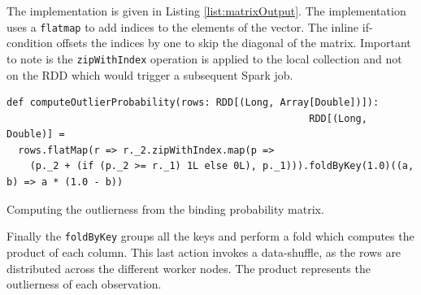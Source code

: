 The implementation is given in Listing \ref{list:matrixOutput}. The implementation uses a \texttt{flatmap} to add indices to the elements of the vector. The inline if-condition offsets the indices by one to skip the diagonal of the matrix. Important to note is the \texttt{zipWithIndex} operation is applied to the local collection and not on the RDD which would trigger a subsequent Spark job.

\begin{listing}[ht!]
\begin{verbatim}
def computeOutlierProbability(rows: RDD[(Long, Array[Double])]):
                                                    RDD[(Long, Double)] =
  rows.flatMap(r => r._2.zipWithIndex.map(p =>
    (p._2 + (if (p._2 >= r._1) 1L else 0L), p._1))).foldByKey(1.0)((a, b) => a * (1.0 - b))
\end{verbatim}

\caption{Computing the outlierness from the binding probability matrix.}
\label{list:matrixOutput}
\end{listing}

Finally the \texttt{foldByKey} groups all the keys and perform a fold which computes the product of each column. This last action invokes a data-shuffle, as the rows are distributed across the different worker nodes. The product represents the outlierness of each observation.